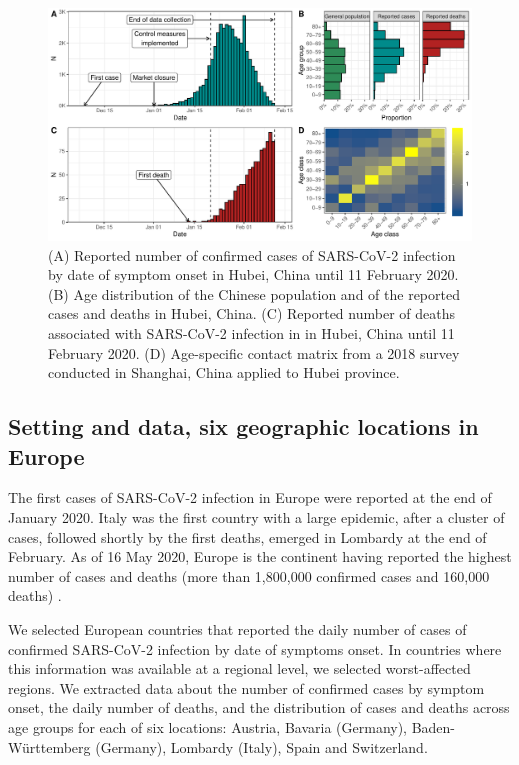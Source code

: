 \documentclass{article}
\begin{document}
\begin{figure}[t]
	\includegraphics[width=\linewidth]{../format_output/figures_v3/fig1.pdf}
	\caption{(A) Reported number of confirmed cases of SARS-CoV-2 infection by date of symptom onset in Hubei, China until 11 February 2020. (B) Age distribution of the Chinese population and of the reported cases and deaths in Hubei, China. (C) Reported number of deaths associated with SARS-CoV-2 infection in  in Hubei, China until 11 February 2020. (D) Age-specific contact matrix from a 2018 survey conducted in Shanghai, China \cite{zhang2019patterns} applied to Hubei province.}
	\label{fig:desc}
\end{figure}


\subsection*{Setting and data, six geographic locations in Europe}

The first cases of SARS-CoV-2 infection in Europe were reported at the end of January 2020. 
Italy was the first country with a large epidemic, after a cluster of cases, followed shortly by the first deaths, emerged in Lombardy at the end of February. 
As of 16 May 2020, Europe is the continent having reported the highest number of cases and deaths (more than 1,800,000 confirmed cases and 160,000 deaths) \cite{whoreport117}.

We selected European countries that reported the daily number of cases of confirmed SARS-CoV-2 infection by date of symptoms onset. In countries where this information was available at a regional level, we selected worst-affected regions. 
We extracted data about the number of confirmed cases by symptom onset, the daily number of deaths, and the distribution of cases and deaths across age groups for each of six locations: Austria, Bavaria (Germany), Baden-Württemberg (Germany), Lombardy (Italy), Spain and Switzerland.
\end{document}
